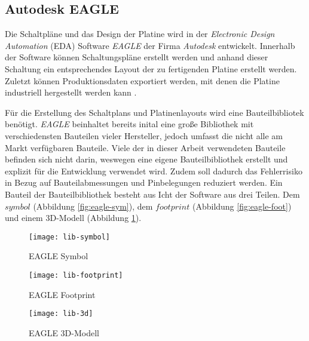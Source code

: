 
\subsection{Autodesk EAGLE}
Die Schaltpläne und das Design der Platine wird in der \textit{Electronic Design Automation} (EDA) Software \textit{EAGLE} der Firma \textit{Autodesk} entwickelt. Innerhalb der Software können Schaltungspläne erstellt werden und anhand dieser Schaltung ein entsprechendes Layout der zu fertigenden Platine erstellt werden. Zuletzt können Produktionsdaten exportiert werden, mit denen die Platine industriell hergestellt werden kann \cite{eagle_homepage}.

Für die Erstellung des Schaltplans und Platinenlayouts wird eine Bauteilbibliotek benötigt. \textit{EAGLE} beinhaltet bereits inital eine große Bibliothek mit verschiedensten Bauteilen vieler Hersteller, jedoch umfasst die nicht alle am Markt verfügbaren Bauteile. Viele der in dieser Arbeit verwendeten Bauteile befinden sich nicht darin, weswegen eine eigene Bauteilbibliothek erstellt und explizit für die Entwicklung verwendet wird. Zudem soll dadurch das Fehlerrisiko in Bezug auf Bauteilabmessungen und Pinbelegungen reduziert werden. Ein Bauteil der Bauteilbibliothek besteht aus Icht der Software aus drei Teilen. Dem $symbol$ (Abbildung \ref{fig:eagle-sym}), dem $footprint$ (Abbildung \ref{fig:eagle-foot}) und einem 3D-Modell (Abbildung \ref{fig:eagle-3d}).
\begin{figure}[h]
	\centering
	\begin{minipage}{.3\linewidth}
		\centering
		\texttt{[image: lib-symbol]}
		\caption{EAGLE Symbol}
		\label{fig:eagle-sym}
	\end{minipage}
	\hfill
	\begin{minipage}{.3\linewidth}
		\centering
		\texttt{[image: lib-footprint]}
		\caption{EAGLE Footprint}
		\label{fig:eagle-foot}
	\end{minipage}
	\hfill
	\begin{minipage}{.3\linewidth}
		\centering
		\texttt{[image: lib-3d]}
		\caption{EAGLE 3D-Modell}
		\label{fig:eagle-3d}
	\end{minipage}
\end{figure}
